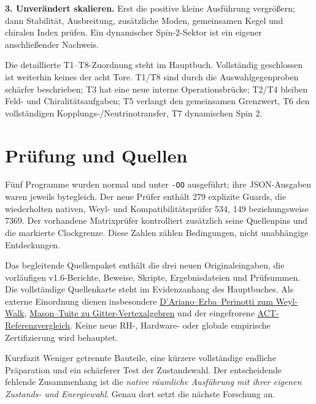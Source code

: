 \textbf{3. Unverändert skalieren.} Erst die positive kleine Ausführung vergrößern; dann Stabilität, Ausbreitung, zusätzliche Moden, gemeinsamen Kegel und chiralen Index prüfen. Ein dynamischer Spin-2-Sektor ist ein eigener anschließender Nachweis.

Die detaillierte T1--T8-Zuordnung steht im Hauptbuch. Vollständig geschlossen ist weiterhin keines der acht Tore. T1/T8 sind durch die Auswahlgegenproben schärfer beschrieben; T3 hat eine neue interne Operationsbrücke; T2/T4 bleiben Feld- und Chiralitätsaufgaben; T5 verlangt den gemeinsamen Grenzwert, T6 den vollständigen Kopplungs-/Neutrinotransfer, T7 dynamischen Spin 2.

\section*{Prüfung und Quellen}
Fünf Programme wurden normal und unter \texttt{-OO} ausgeführt; ihre JSON-Ausgaben waren jeweils bytegleich. Der neue Prüfer enthält 279 explizite Guards, die wiederholten nativen, Weyl- und Kompatibilitätsprüfer 534, 149 beziehungsweise 7369. Der vorhandene Matrixprüfer kontrolliert zusätzlich seine Quellenpins und die markierte Clockgrenze. Diese Zahlen zählen Bedingungen, nicht unabhängige Entdeckungen.

Das begleitende Quellenpaket enthält die drei neuen Originaleingaben, die vorläufigen v1.6-Berichte, Beweise, Skripte, Ergebnisdateien und Prüfsummen. Die vollständige Quellenkarte steht im Evidenzanhang des Hauptbuches. Als externe Einordnung dienen insbesondere \href{https://arxiv.org/abs/1708.00826}{D'Ariano--Erba--Perinotti zum Weyl-Walk}, \href{https://arxiv.org/html/0912.0117v1}{Mason--Tuite zu Gitter-Vertexalgebren} und der eingefrorene \href{https://arxiv.org/abs/2503.14452}{ACT-Referenzvergleich}. Keine neue RH-, Hardware- oder globale empirische Zertifizierung wird behauptet.

\begin{bild}{Kurzfazit}
Weniger getrennte Bauteile, eine kürzere vollständige endliche Präparation und ein schärferer Test der Zustandswahl. Der entscheidende fehlende Zusammenhang ist die \emph{native räumliche Ausführung mit ihrer eigenen Zustands- und Energiewahl}. Genau dort setzt die nächste Forschung an.
\end{bild}
